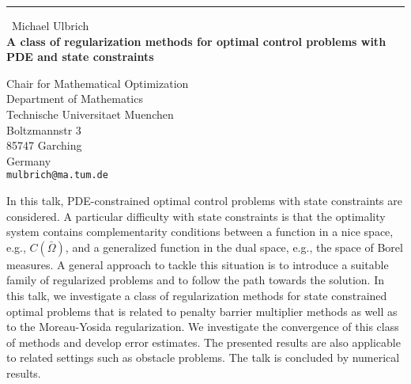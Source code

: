 \documentclass{report}
\begin{document}
\begin{center}
\rule{6in}{1pt} \
{\large Michael Ulbrich \\
{\bf A class of regularization methods for optimal control problems with PDE and state constraints }}

Chair for Mathematical Optimization \\ Department of Mathematics \\ Technische Universitaet Muenchen \\ Boltzmannstr 3 \\ 85747 Garching \\ Germany
\\
{\tt mulbrich@ma.tum.de}\end{center}

In this talk, PDE-constrained optimal control problems with state
constraints are considered. A particular difficulty with state
constraints is that the optimality system contains complementarity
conditions between a function in a nice space, e.g., $C(\bar\Omega)$, and
a generalized function in the dual space, e.g., the space of Borel
measures.
A general approach to tackle this situation is to introduce a suitable
family of regularized problems and to follow the path towards the
solution.
In this talk, we investigate a class of regularization methods for state
constrained optimal problems that is related to penalty barrier
multiplier methods as well as to the Moreau-Yosida regularization.
We investigate the convergence of this class of methods and develop error
estimates. The presented results are also applicable to related settings
such as obstacle problems. The talk is concluded by numerical results.
\end{document}
